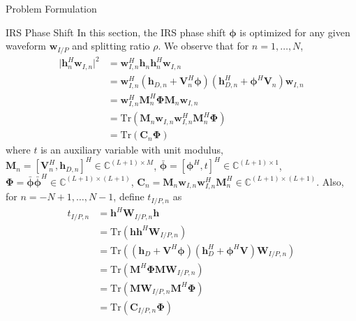 \documentclass[journal]{IEEEtran}
\begin{document}
\begin{section}{Problem Formulation}
		\begin{subsection}{IRS Phase Shift}
			In this section, the IRS phase shift $\boldsymbol{\phi}$ is optimized for any given waveform $\boldsymbol{w}_{I/P}$ and splitting ratio $\rho$. We observe that for $n=1,\dots,N$,
			\begin{align}
				\lvert \boldsymbol{h}_{n}^H\boldsymbol{w}_{I,n} \rvert^2
				& = \boldsymbol{w}_{I,n}^H\boldsymbol{h}_n\boldsymbol{h}_n^H\boldsymbol{w}_{I,n}\nonumber\\
				& = \boldsymbol{w}_{I,n}^H(\boldsymbol{h}_{D,n}+\boldsymbol{V}_n^H\boldsymbol{\phi})(\boldsymbol{h}_{D,n}^H+\boldsymbol{\phi}^H\boldsymbol{V}_n)\boldsymbol{w}_{I,n}\nonumber\\
				& = \boldsymbol{w}_{I,n}^H\boldsymbol{M}_n^H\boldsymbol{\Phi}\boldsymbol{M}_n\boldsymbol{w}_{I,n}\nonumber\\
				& = \mathrm{Tr}(\boldsymbol{M}_n\boldsymbol{w}_{I,n}\boldsymbol{w}_{I,n}^H\boldsymbol{M}_n^H\boldsymbol{\Phi})\nonumber\\
				& = \mathrm{Tr}(\boldsymbol{C}_n\boldsymbol{\Phi})
			\end{align}
			where $t$ is an auxiliary variable with unit modulus, $\boldsymbol{M}_n=[\boldsymbol{V}_n^H, \boldsymbol{h}_{D,n}]^H \in \mathbb{C}^{(L+1) \times M}$, $\bar{\boldsymbol{\phi}}=[\boldsymbol{\phi}^H, t]^H \in \mathbb{C}^{(L+1) \times 1}$, $\boldsymbol{\Phi}=\bar{\boldsymbol{\phi}}\bar{\boldsymbol{\phi}}^H \in \mathbb{C}^{(L+1) \times (L+1)}$, $\boldsymbol{C}_n = \boldsymbol{M}_n\boldsymbol{w}_{I,n}\boldsymbol{w}_{I,n}^H\boldsymbol{M}_n^H \in \mathbb{C}^{(L+1)\times(L+1)}$. Also, for $n=-N+1,\dots,N-1$, define $t_{I/P,n}$ as
			\begin{align}
				t_{I/P,n}
				& = \boldsymbol{h}^H\boldsymbol{W}_{I/P,n}\boldsymbol{h}\nonumber\\
				& = \mathrm{Tr}(\boldsymbol{h}\boldsymbol{h}^H\boldsymbol{W}_{I/P,n})\nonumber\\
				& = \mathrm{Tr}\left((\boldsymbol{h}_{D}+\boldsymbol{V}^H\boldsymbol{\phi})(\boldsymbol{h}_{D}^H+\boldsymbol{\phi}^H\boldsymbol{V})\boldsymbol{W}_{I/P,n}\right)\nonumber\\
				& = \mathrm{Tr}(\boldsymbol{M}^H\boldsymbol{\Phi}\boldsymbol{M}\boldsymbol{W}_{I/P,n})\nonumber\\
				& = \mathrm{Tr}(\boldsymbol{M}\boldsymbol{W}_{I/P,n}\boldsymbol{M}^H\boldsymbol{\Phi})\nonumber\\
				& = \mathrm{Tr}(\boldsymbol{C}_{I/P,n}\boldsymbol{\Phi})
			\end{align}

\end{subsection}
\end{section}
\end{document}
